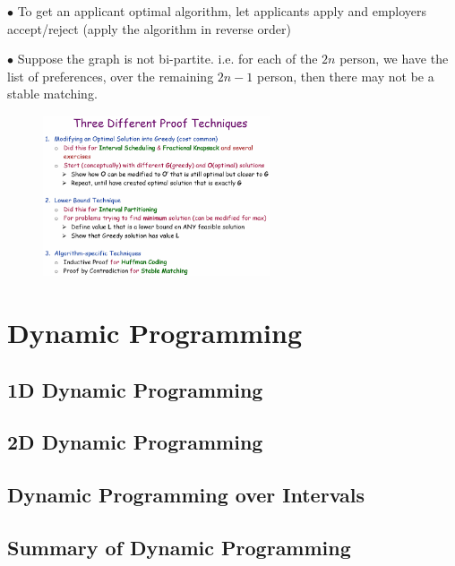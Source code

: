 \documentclass[10pt]{article}
\begin{document}
$\bullet$ To get an applicant optimal algorithm, let applicants apply and employers accept/reject (apply the algorithm in reverse order)

$\bullet$ Suppose the graph is not bi-partite. i.e. for each of the $2n$ person, we have the list of preferences, over the remaining $2n-1$ person, then there may not be a stable matching.

\begin{figure}[h]
	\centering
	\includegraphics[width=0.6\textwidth]{img5-4}
\end{figure}

\section{Dynamic Programming}

\subsection{1D Dynamic Programming}














\subsection{2D Dynamic Programming}

\subsection{Dynamic Programming over Intervals}

\subsection{Summary of Dynamic Programming}
\end{document}
